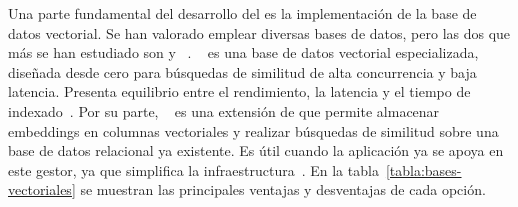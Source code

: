 Una parte fundamental del desarrollo del  es la implementación de la base de datos vectorial. Se han valorado emplear diversas bases de datos, pero las dos que más se han estudiado son  y ~. ~\cite{selenium:docs} es una base de datos vectorial especializada, diseñada desde cero para búsquedas de similitud de alta concurrencia y baja latencia. Presenta equilibrio entre el rendimiento, la latencia y el tiempo de indexado~\cite{llmeng:handbook}. Por su parte, ~\cite{playwright:actionability} es una extensión de  que permite almacenar embeddings en columnas vectoriales y realizar búsquedas de similitud sobre una base de datos relacional ya existente. Es útil cuando la aplicación ya se apoya en este gestor, ya que simplifica la infraestructura~\cite{Qdrant:pgvector}. En la tabla~\ref{tabla:bases-vectoriales} se muestran las principales ventajas y desventajas de cada opción.


